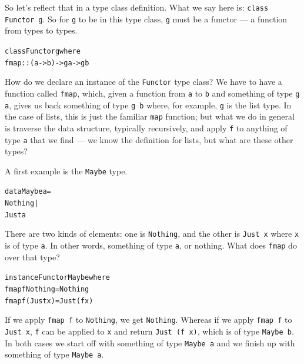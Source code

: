 So let's reflect that in a type class definition. What we say here is: \texttt{class Functor g}. So for \texttt{g} to be in this type class, \texttt{g} must be a functor — a function from types to types. 
\begin{alltt}
class Functor g where
  fmap :: (a -> b) -> g a -> g b
\end{alltt}
How do we declare an instance of the \texttt{Functor} type class? We have to have a function called \texttt{fmap}, which, given a function from \texttt{a} to \texttt{b} and something of type \texttt{g a}, gives us back something of type \texttt{g b} where, for example, \texttt{g} is the list type. In the case of lists, this is just the familiar \texttt{map} function; but what we do in general is traverse the data structure, typically recursively, and apply \texttt{f} to anything of type \texttt{a} that we find — we know the definition for lists, but what are these other types?

A first example is the \texttt{Maybe} type.
\begin{alltt}
data Maybe a =  
  Nothing |
  Just a
\end{alltt}
There are two kinds of elements: one is \texttt{Nothing}, and the other is \texttt{Just x} where \texttt{x} is of type \texttt{a}. In other words, something of type \texttt{a}, or nothing. What does \texttt{fmap} do over that type? 
\begin{alltt}
instance Functor Maybe where
  fmap f Nothing  = Nothing
  fmap f (Just x) = Just (f x)
\end{alltt}
If we apply \texttt{fmap f} to \texttt{Nothing}, we get \texttt{Nothing}. Whereas if we apply \texttt{fmap f} to \texttt{Just x}, \texttt{f} can be applied to \texttt{x} and return \texttt{Just (f x)}, which is of type \texttt{Maybe b}. In both cases we start off with something of type \texttt{Maybe a} and we finish up with something of type \texttt{Maybe a}.

